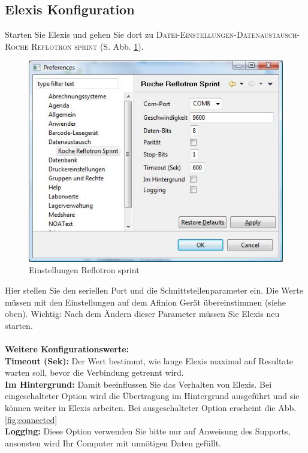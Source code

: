 \documentclass[a4paper]{scrartcl}
\begin{document}
\subsection{Elexis Konfiguration}
Starten Sie Elexis und gehen Sie dort zu \textsc{Datei-Einstellungen-Datenaustausch-Roche Reflotron sprint} (S. Abb. \ref{fig:config}).
\begin{figure}[h]
    \includegraphics{config}
    \caption{Einstellungen Reflotron sprint}
    \label{fig:config}
\end{figure}
Hier stellen Sie den seriellen Port und die Schnittstellenparameter ein. Die Werte m\"ussen mit den Einstellungen auf dem Afinion Ger\"at \"ubereinstimmen (siehe oben). Wichtig: Nach dem \"Andern dieser Parameter m\"ussen Sie Elexis neu starten.\\
\\
\textbf{Weitere Konfigurationswerte:}\\
\textbf{Timeout (Sek):} Der Wert bestimmt, wie lange Elexis maximal auf Resultate warten soll, bevor die Verbindung getrennt wird.\\
\textbf{Im Hintergrund:} Damit beeinflussen Sie das Verhalten von Elexis. Bei eingeschalteter Option wird die \"Ubertragung im Hintergrund ausgef\"uhrt und sie k\"onnen weiter in Elexis arbeiten. Bei ausgeschalteter Option erscheint die Abb. \ref{fig:connected}\\
\textbf{Logging:} Diese Option verwenden Sie bitte nur auf Anweisung des Supports, ansonsten wird Ihr Computer mit unn\"otigen Daten gef\"ullt.\\
\end{document}
